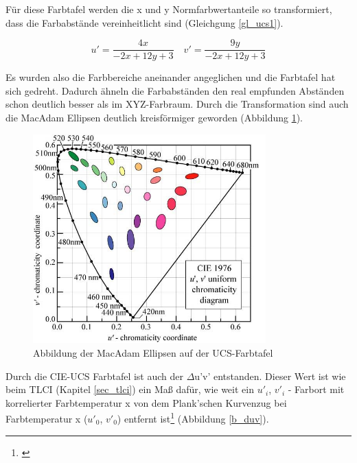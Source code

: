 Für diese Farbtafel werden die x und y Normfarbwertanteile so transformiert, dass die Farbabstände vereinheitlicht sind (Gleichgung \ref{gl_ucs1}).

\begin{equation}\label{gl_ucs1}
		u' = \frac{4x}{-2x+12y+3} \quad v' = \frac{9y}{-2x+12y+3}
\end{equation}

Es wurden also die Farbbereiche aneinander angeglichen und die Farbtafel hat sich gedreht. Dadurch ähneln die Farbabständen den real empfunden Abständen schon deutlich besser als im XYZ-Farbraum. Durch die Transformation sind auch die MacAdam Ellipsen deutlich kreisförmiger geworden (Abbildung \ref{b_ucs}).  

\begin{figure}[H]     %
\centering
\includegraphics[width=0.8\textwidth]{bilder/ucs} 
\caption {Abbildung der MacAdam Ellipsen auf der UCS-Farbtafel \protect\footnotemark}\label{b_ucs}
\end{figure}


Durch die CIE-UCS Farbtafel ist auch der $\Delta$u'v' entstanden. Dieser Wert ist wie beim TLCI (Kapitel \ref{sec_tlci}) ein Maß dafür, wie weit ein $u'_{i}$, $v'_{i}$ - Farbort mit korrelierter Farbtemperatur x von dem Plank'schen Kurvenzug bei Farbtemperatur x ($u'_{0}$, $v'_{0}$) entfernt ist\footnote{\cite[566]{jiyupe}} (Abbildung \ref{b_duv}).

